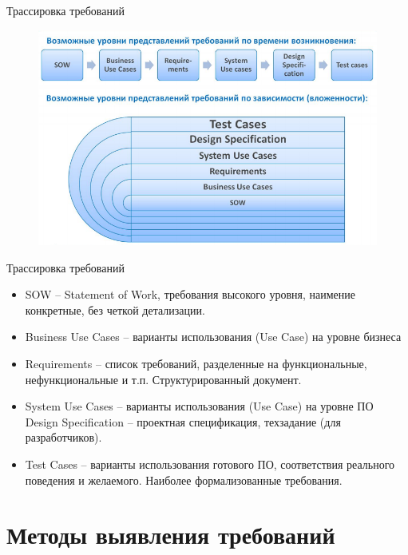 \documentclass{beamer}
\begin{document}
\begin{frame}[t]{Трассировка требований}
\begin{figure}[h]
\centering
\includegraphics[scale=0.5]{images/lec02-pic07.png}
\end{figure}
\end{frame}    

\begin{frame}[t]{Трассировка требований}
\begin{itemize}
\item SOW – Statement of Work, требования высокого уровня, наимение конкретные, без четкой детализации.
\item Business Use Cases – варианты использования (Use Case) на уровне бизнеса
\item Requirements – список требований, разделенные на функциональные, нефункциональные и т.п. Структурированный документ.
\item System Use Cases – варианты использования (Use Case) на уровне ПО Design Specification – проектная спецификация, техзадание (для разработчиков).
\item Test Cases – варианты использования готового ПО, соответствия реального поведения и желаемого. Наиболее формализованные требования.
\end{itemize}
\end{frame}

\section{Методы выявления требований}
\end{document}
